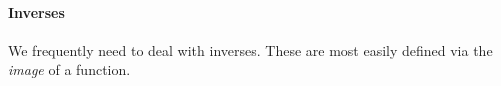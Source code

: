 \paragraph*{Inverses}
We frequently need to deal with inverses. These are most easily defined via the
\emph{image} of a function.

\begin{code}%
\>[0]\AgdaSpace{}%
\AgdaModule{\AgdaUnderscore{}}\AgdaSpace{}%
\AgdaSymbol{\{}\AgdaSpace{}%
\AgdaSymbol{:}\AgdaSpace{}%
\AgdaSpace{}%
\AgdaSpace{}%
\AgdaSymbol{\}\{}\AgdaSpace{}%
\AgdaSymbol{:}\AgdaSpace{}%
\AgdaSpace{}%
\AgdaSpace{}%
\AgdaSymbol{\}}\AgdaSpace{}%
\<%
\\
\>[0][@{}l@{\AgdaIndent{0}}]%
\>[1]\AgdaSpace{}%
\AgdaSpace{}%
\AgdaSpace{}%
\AgdaSpace{}%
\AgdaSymbol{(}\AgdaSpace{}%
\AgdaSpace{}%
\AgdaSymbol{;}\AgdaSpace{}%
\AgdaSpace{}%
\AgdaSymbol{)}\AgdaSpace{}%
\AgdaSpace{}%
\AgdaSymbol{(}\AgdaSpace{}%
\AgdaSpace{}%
\AgdaSpace{}%
\AgdaSpace{}%
\AgdaSymbol{)}\<%
\\
%
\\[\AgdaEmptyExtraSkip]%
%
\>[1]\AgdaSpace{}%
\AgdaSpace{}%
\AgdaSymbol{(}\AgdaSpace{}%
\AgdaSymbol{:}\AgdaSpace{}%
\AgdaSpace{}%
\AgdaSpace{}%
\AgdaSymbol{)}\AgdaSpace{}%
\AgdaSymbol{:}\AgdaSpace{}%
\AgdaSpace{}%
\AgdaSpace{}%
\AgdaSpace{}%
\AgdaSymbol{(}\AgdaSpace{}%
\AgdaSpace{}%
\AgdaSpace{}%
\AgdaSpace{}%
\AgdaSymbol{)}\AgdaSpace{}%
\<%
\\
\>[1][@{}l@{\AgdaIndent{0}}]%
\>[2]\AgdaSpace{}%
\AgdaSymbol{:}\AgdaSpace{}%
\AgdaSymbol{\{}\AgdaSpace{}%
\AgdaSymbol{:}\AgdaSpace{}%
\AgdaSymbol{\}}\AgdaSpace{}%
\AgdaSpace{}%
\AgdaSpace{}%
\AgdaSpace{}%
\AgdaSpace{}%
\AgdaSpace{}%
\AgdaSpace{}%
\AgdaSpace{}%
\AgdaSpace{}%
\AgdaSpace{}%
\AgdaSpace{}%
\AgdaSpace{}%
\AgdaSpace{}%
\AgdaSpace{}%
\<%
\end{code}

